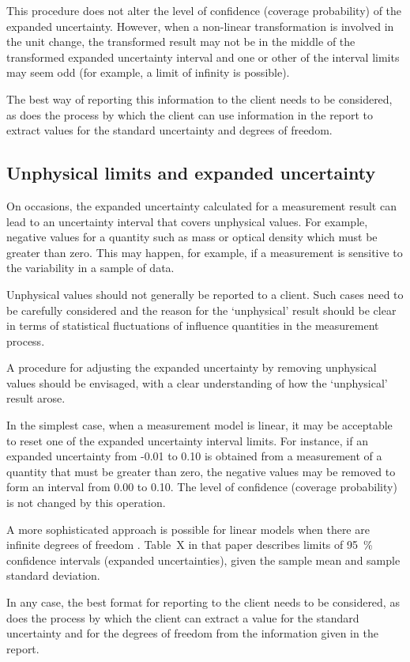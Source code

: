 This procedure does not alter the level of confidence (coverage probability) of the expanded uncertainty. However, when a non-linear transformation is involved in the unit change, the transformed result may not be in the middle of the transformed expanded uncertainty interval and one or other of the interval limits may seem odd (for example, a limit of infinity is possible).
 
The best way of reporting this information to the client needs to be considered, as does the process by which the client can use information in the report to extract values for the standard uncertainty and degrees of freedom.

\subsection{Unphysical limits and expanded uncertainty}
On occasions, the expanded uncertainty calculated for a measurement result can lead to an uncertainty interval that covers unphysical values.  For example, negative values for a quantity such as mass or optical density which must be greater than zero. This may happen, for example, if a measurement is sensitive to the variability in a sample of data. 

Unphysical values should not generally be reported to a client.
Such cases need to be carefully considered and the reason for the ‘unphysical’ result should be clear in terms of statistical fluctuations of influence quantities in the measurement process.  

A procedure for adjusting the expanded uncertainty by removing unphysical values should be envisaged, with a clear understanding of how the ‘unphysical’ result arose. 

In the simplest case, when a measurement model is linear, it may be acceptable to reset one of the expanded uncertainty interval limits. For instance, if an expanded uncertainty from -0.01 to 0.10 is obtained from a measurement of a quantity that must be greater than zero, the negative values may be removed to form an interval from 0.00 to 0.10. The level of confidence (coverage probability) is not changed by this operation.

A more sophisticated approach is possible for linear models when there are infinite degrees of freedom \cite{FELDMAN_COUSINS_99}. Table~X in that paper describes limits of \SI{95}{\%} confidence intervals (expanded uncertainties), given the sample mean and sample standard deviation.

In any case, the best format for reporting to the client needs to be considered, as does the process by which the client can extract a value for the standard uncertainty and for the degrees of freedom from the information given in the report.

